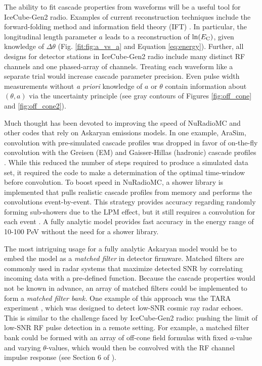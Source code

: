 \documentclass[amsmath,amssymb,aps,prd,10pt,twocolumn]{revtex4}
\begin{document}
The ability to fit cascade properties from waveforms will be a useful tool for IceCube-Gen2 radio.  Examples of current reconstruction techniques include the forward-folding method \cite{10.1088/1748-0221/15/09/p09039} and information field theory (IFT) \cite{IFT}.  In particular, the longitudinal length parameter $a$ leads to a reconstruction of $\ln(E_{\rm C})$, given knowledge of $\Delta \theta$ (Fig. \ref{fit:fig:a_vs_a} and Equation \ref{eq:energy}).  Further, all designs for detector stations in IceCube-Gen2 radio include many distinct RF channels and one phased-array of channels.  Treating each waveform like a separate trial would increase cascade parameter precision.  Even pulse width measurements without \textit{a priori} knowledge of $a$ or $\theta$ contain information about $(\theta,a)$ via the uncertainty principle (see gray contours of Figures \ref{fig:off_cone} and \ref{fig:off_cone2}).

Much thought has been devoted to improving the speed of NuRadioMC and other codes that rely on Askaryan emissions models.  In one example, AraSim, convolution with pre-simulated cascade profiles was dropped in favor of on-the-fly convolution with the Greisen (EM) and Gaisser-Hillas (hadronic) cascade profiles \cite{testbed}.  While this reduced the number of steps required to produce a simulated data set, it required the code to make a determination of the optimal time-window before convolution.  To boost speed in NuRadioMC, a shower library is implemented that pulls realistic cascade profiles from memory and performs the convolutions event-by-event.  This strategy provides accuracy regarding randomly forming sub-showers due to the LPM effect, but it still requires a convolution for each event \cite{10.1140/epjc/s10052-020-7612-8}.  A fully analytic model provides fast accuracy in the energy range of 10-100 PeV without the need for a shower library.

The most intriguing usage for a fully analytic Askaryan model would be to embed the model as a \textit{matched filter} in detector firmware.  Matched filters are commonly used in radar systems that maximize detected SNR by correlating incoming data with a pre-defined function.  Because the cascade properties would not be known in advance, an array of matched filters could be implemented to form a \textit{matched filter bank.}  One example of this approach was the TARA experiment \cite{ABBASI20171}, which was designed to detect low-SNR cosmic ray radar echoes.  This is similar to the challenge faced by IceCube-Gen2 radio: pushing the limit of low-SNR RF pulse detection in a remote setting.  For example, a matched filter bank could be formed with an array of off-cone field formulas with fixed $a$-value and varying $\theta$-values, which would then be convolved with the RF channel impulse response (see Section 6 of \cite{10.1016/j.astropartphys.2014.09.002}).
\end{document}
